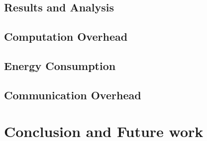 \documentclass[twocolumn,10pt,journal]{IEEEtran}
\begin{document}
\subsection{Results and Analysis}
\subsection{Computation Overhead} \label{comp}
\subsection{Energy Consumption} \label{ene}
\subsection{Communication Overhead} \label{comm}

\section{Conclusion and Future work} \label{sec7}



\end{document}
